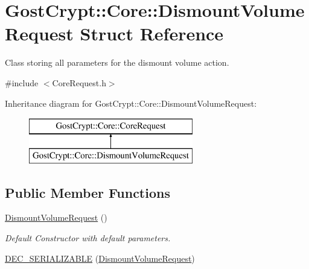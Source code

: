 \hypertarget{struct_gost_crypt_1_1_core_1_1_dismount_volume_request}{}\section{Gost\+Crypt\+:\+:Core\+:\+:Dismount\+Volume\+Request Struct Reference}
\label{struct_gost_crypt_1_1_core_1_1_dismount_volume_request}


Class storing all parameters for the dismount volume action.  




{\ttfamily \#include $<$Core\+Request.\+h$>$}

Inheritance diagram for Gost\+Crypt\+:\+:Core\+:\+:Dismount\+Volume\+Request\+:\begin{figure}[H]
\begin{center}
\leavevmode
\includegraphics[height=2.000000cm]{struct_gost_crypt_1_1_core_1_1_dismount_volume_request}
\end{center}
\end{figure}
\subsection*{Public Member Functions}
\begin{DoxyCompactItemize}
\item 
\hyperlink{struct_gost_crypt_1_1_core_1_1_dismount_volume_request_abd07af8e1fd2932075406e430c39e36d}{Dismount\+Volume\+Request} ()
\begin{DoxyCompactList}\small\item\em Default Constructor with default parameters. \end{DoxyCompactList}\item 
\hyperlink{struct_gost_crypt_1_1_core_1_1_dismount_volume_request_a3dcae0d853172e9457137920db461bde}{D\+E\+C\+\_\+\+S\+E\+R\+I\+A\+L\+I\+Z\+A\+B\+LE} (\hyperlink{struct_gost_crypt_1_1_core_1_1_dismount_volume_request}{Dismount\+Volume\+Request})
\end{DoxyCompactItemize}
